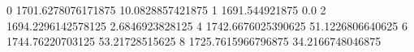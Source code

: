0 1701.6278076171875 10.0828857421875
1 1691.544921875 0.0
2 1694.2296142578125 2.6846923828125
4 1742.6676025390625 51.1226806640625
6 1744.76220703125 53.21728515625
8 1725.7615966796875 34.2166748046875
